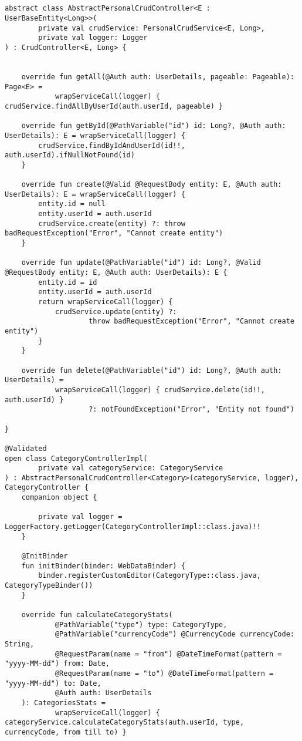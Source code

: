 
\begin{lstlisting}[style = ktstyle]


abstract class AbstractPersonalCrudController<E : UserBaseEntity<Long>>(
        private val crudService: PersonalCrudService<E, Long>,
        private val logger: Logger
) : CrudController<E, Long> {


    override fun getAll(@Auth auth: UserDetails, pageable: Pageable): Page<E> =
            wrapServiceCall(logger) { crudService.findAllByUserId(auth.userId, pageable) }

    override fun getById(@PathVariable("id") id: Long?, @Auth auth: UserDetails): E = wrapServiceCall(logger) {
        crudService.findByIdAndUserId(id!!, auth.userId).ifNullNotFound(id)
    }

    override fun create(@Valid @RequestBody entity: E, @Auth auth: UserDetails): E = wrapServiceCall(logger) {
        entity.id = null
        entity.userId = auth.userId
        crudService.create(entity) ?: throw badRequestException("Error", "Cannot create entity")
    }

    override fun update(@PathVariable("id") id: Long?, @Valid @RequestBody entity: E, @Auth auth: UserDetails): E {
        entity.id = id
        entity.userId = auth.userId
        return wrapServiceCall(logger) {
            crudService.update(entity) ?:
                    throw badRequestException("Error", "Cannot create entity")
        }
    }

    override fun delete(@PathVariable("id") id: Long?, @Auth auth: UserDetails) =
            wrapServiceCall(logger) { crudService.delete(id!!, auth.userId) }
                    ?: notFoundException("Error", "Entity not found")

}

@Validated
open class CategoryControllerImpl(
        private val categoryService: CategoryService
) : AbstractPersonalCrudController<Category>(categoryService, logger), CategoryController {
    companion object {

        private val logger = LoggerFactory.getLogger(CategoryControllerImpl::class.java)!!
    }

    @InitBinder
    fun initBinder(binder: WebDataBinder) {
        binder.registerCustomEditor(CategoryType::class.java, CategoryTypeBinder())
    }

    override fun calculateCategoryStats(
            @PathVariable("type") type: CategoryType,
            @PathVariable("currencyCode") @CurrencyCode currencyCode: String,
            @RequestParam(name = "from") @DateTimeFormat(pattern = "yyyy-MM-dd") from: Date,
            @RequestParam(name = "to") @DateTimeFormat(pattern = "yyyy-MM-dd") to: Date,
            @Auth auth: UserDetails
    ): CategoriesStats =
            wrapServiceCall(logger) { categoryService.calculateCategoryStats(auth.userId, type, currencyCode, from till to) }


\end{lstlisting}
